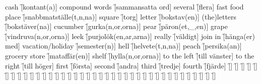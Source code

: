 \begin{questions}
\begin{multicols}{2}
        \question cash \f[kontant(a)]
        \question compound words \f[sammansatta ord]
        \question several \f[flera]
        \question fast food place \f[snabbmatställe(t,n,na)]
        \question square \f[torg]
        \question letter \f[bokstav(en)]
        \question (the)letters \f[bokstäver(na)]
        \question cucumber \f[gurka(n,or,orna)]
        \question pear \f[päron(et,\_,en)]
        \question grape \f[vindruva(n,or,orna)]
        \question leek \f[purjolök(en,ar,arna)]
        \question really \f[väldigt]
        \question join in \f[hänga(er) med]
        \question vacation/holiday \f[semester(n)]
        \question hell \f[helvete(t,n,na)]
        \question peach \f[persika(an)]
        \question grocery store \f[mataffär(en)]
        \question shelf \f[hylla(n,or,orna)]
        \question to the left \f[till vänster]
        \question to the right \f[till höger]
        \question first \f[första]
        \question second \f[andra]
        \question third \f[tredje]
        \question fourth \f[fjärde]
        \question  \f[]
        \question  \f[]
        \question  \f[]
        \question  \f[]
        \question  \f[]
        \question  \f[]
        \question  \f[]
        \question  \f[]
        \question  \f[]
        \question  \f[]
        \question  \f[]
        \question  \f[]
        \question  \f[]
        \question  \f[]
        \question  \f[]
        \question  \f[]
        \question  \f[]
        \question  \f[]
        \question  \f[]
        \question  \f[]
        \question  \f[]
        \question  \f[]
        \question  \f[]
        \question  \f[]
        \question  \f[]
        \question  \f[]
        \question  \f[]
        \question  \f[]
        \question  \f[]
        \question  \f[]
        \question  \f[]
        \question  \f[]
        \question  \f[]
        \question  \f[]
        \question  \f[]
        \question  \f[]
        \question  \f[]
        \question  \f[]
        \question  \f[]
    \end{multicols}
\end{questions}
